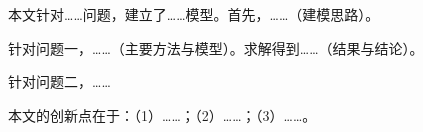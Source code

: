 
本文针对……问题，建立了……模型。首先，……（建模思路）。

针对问题一，……（主要方法与模型）。求解得到……（结果与结论）。

针对问题二，……

本文的创新点在于：（1）……；（2）……；（3）……。
